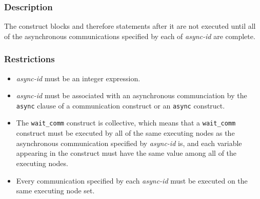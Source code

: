 \subsubsection*{Description}

The {\tt {}} construct blocks and therefore
statements after it are not executed until all of the asynchronous
communications specified by each of {\it async-id} are complete. 

\subsubsection*{Restrictions}

\begin{itemize}
\item {\it async-id} must be an integer expression.
\item {\it async-id} must be associated with an asynchronous
      communciation by the {\tt async} clause of a communication
      construct or an {\tt async} construct.
\item The {\tt wait\_comm} construct is collective, which means that a
      {\tt wait\_comm} construct must be executed by all of the
      same executing nodes as the asynchronous communication specified by
      {\it async-id} is, and each variable appearing in the construct
      must have the same value among all of the executing nodes.
\item Every communication specified by each {\it async-id} must be
      executed on the same executing node set.
\end{itemize}

